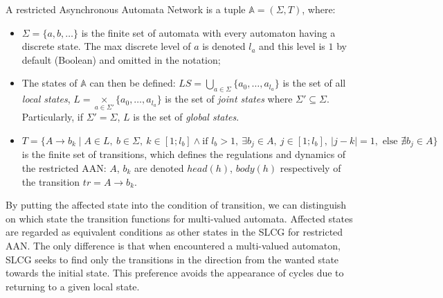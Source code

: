 \begin{definition}\label{def:resAAN}
A restricted Asynchronous Automata Network is a tuple $\mathbb{A} = (\Sigma,T)$, where:
\begin{itemize}
\item $\Sigma=\{a,b,\ldots\}$ is the finite set of automata with every automaton having a discrete state.
The max discrete level of $a$ is denoted $l_a$ and this level is $1$ by default (Boolean) and omitted in the notation;
\item The states of $\mathbb{A}$ can then be defined: $LS= \underset{a\in \Sigma}{\bigcup} \{a_0,\ldots,a_{l_a}\}$ is the set of all \textit{local states}, $L= \underset{a\in \Sigma'}{\times} \{a_0,\ldots,a_{l_a}\}$ is the set of \textit{joint states} where $\Sigma'\subseteq\Sigma$. Particularly, if $\Sigma'=\Sigma$, $L$ is the set of \textit{global states}. 
\item $T=\{A\to b_k\mid A\in L,\ b\in \Sigma,\ k\in[1;l_b]\land \text{if } l_b>1,\ \exists b_j\in A,\ j\in[1;l_b],\ |j-k|=1, \text{ else } \nexists b_j\in A\}$ is the finite set of transitions, which defines the regulations and dynamics of the restricted AAN: $A$, $b_k$ are denoted $head(h)$, $body(h)$ respectively of the transition $tr=A\to b_k$.
\end{itemize}
\end{definition}

By putting the affected state into the condition of transition, we can distinguish on which state the transition functions for multi-valued automata.
Affected states are regarded as equivalent conditions as other states in the SLCG for restricted AAN.
The only difference is that when encountered a multi-valued automaton, SLCG seeks to find only the transitions in the direction from the wanted state towards the initial state. 
This preference avoids the appearance of cycles due to returning to a given local state.

